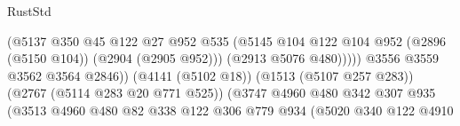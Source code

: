 \begin{lexlean}{RustStd}
\begin{coremodule}
                                                          (@5137
                                                            @350
                                                            @45
                                                            @122
                                                            @27
                                                            @952
                                                            @535
                                                            (@5145
                                                              @104
                                                              @122
                                                              @104
                                                              @952
                                                              (@2896 (@5150 @104))
                                                              (@2904 (@2905 @952)))
                                                            (@2913 @5076 @480)))))
                                                    @3556
                                                    @3559
                                                    @3562
                                                    @3564
                                                    @2846))
                                                (@4141 (@5102 @18))
                                                (@1513 (@5107 @257 @283))
                                                (@2767 (@5114 @283 @20 @771 @525))
                                                (@3747
                                                  @4960
                                                  @480
                                                  @342
                                                  @307
                                                  @935
                                                  (@3513
                                                    @4960
                                                    @480
                                                    @82
                                                    @338
                                                    @122
                                                    @306
                                                    @779
                                                    @934
                                                    (@5020
                                                      @340
                                                      @122
                                                      @4910

\end{coremodule}
\end{lexlean}
